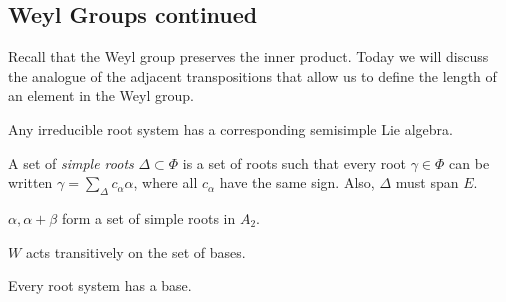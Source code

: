 \documentclass[twoside, 10pt]{article}
\begin{document}
    \subsection{Weyl Groups continued}%
    
    Recall that the Weyl group preserves the inner product. Today we will
    discuss the analogue of the adjacent transpositions that allow us to define
    the length of an element in the Weyl group. 

    \begin{rmk} Any irreducible root system has a corresponding semisimple Lie
    algebra.  \end{rmk}

    \begin{defn} A set of \textit{simple roots} $\Delta \subset \Phi$ is a set
        of roots such that every root $\gamma \in \Phi$ can be written $\gamma
        = \sum_{\Delta} c_{\alpha}\alpha$, where all $c_{\alpha}$ have the same
        sign. Also, $\Delta$ must span $E$.  \end{defn}

    \begin{exm} $\alpha,\alpha + \beta$ form a set of simple roots in $A_2$.
    \end{exm}

    \begin{prop} $W$ acts transitively on the set of bases.  \end{prop}

    \begin{prop} Every root system has a base.  \end{prop}
\end{document}
